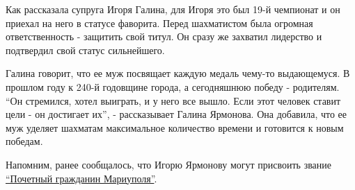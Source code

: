 Как рассказала супруга Игоря Галина, для Игоря это был 19-й чемпионат и он
приехал на него в статусе фаворита. Перед шахматистом была огромная
ответственность - защитить свой титул. Он сразу же захватил лидерство и
подтвердил свой статус сильнейшего.

Галина говорит, что ее муж посвящает каждую медаль чему-то выдающемуся. В
прошлом году к 240-й годовщине города, а сегодняшнюю победу - родителям. \enquote{Он
стремился, хотел выиграть, и у него все вышло. Если этот человек ставит цели -
он достигает их}, - рассказывает Галина Ярмонова. Она добавила, что ее муж
уделяет шахматам максимальное количество времени и готовится к новым победам.

Напомним, ранее сообщалось, что Игорю Ярмонову могут присвоить звание \href{https://www.0629.com.ua/news/2440768/sahmatistu-igoru-armonovu-hotat-prisvoit-zvanie-pocetnyj-grazdanin-mariupola}{\enquote{Почетный
гражданин Мариуполя}}.
